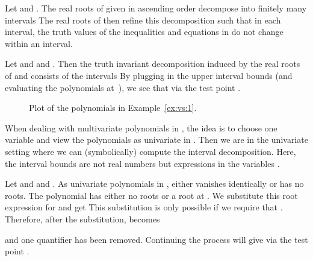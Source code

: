 \documentclass{llncs}
\begin{document}
Let  and . The
real roots  of  given in ascending order decompose
 into finitely many intervals
 The real roots of
 then refine this decomposition such that in each interval, the truth
values of the inequalities and equations in  do not change within an
interval. 

\begin{example}
\label{ex:vs:1}
Let  and  and . Then the truth invariant decomposition induced by
the real roots of  and  consists of the intervals
 By plugging in the
upper interval bounds (and evaluating the polynomials at~), we see that
 via the test point .
\begin{figure}
  \begin{center}

  \end{center}

  \caption{\label{fig:vs}Plot of the polynomials in Example~\ref{ex:vs:1}.}
\end{figure}
\end{example}
When dealing with multivariate polynomials in , the idea
is to choose one variable  and view the polynomials as univariate in
. Then we are in the univariate setting where we can (symbolically) compute
the interval decomposition. Here, the interval bounds are not real numbers but
expressions in the variables .

\begin{example}
  Let  and  and . As univariate polynomials in , 
  either vanishes identically or has no roots. The polynomial  has either
  no roots or a root at . We substitute this root expression for 
  and get
   This substitution is only possible if we
  require that . Therefore, after the substitution, 
  becomes
  
  and one quantifier has been removed. Continuing the process will give
   via the test point .
\end{example}
\end{document}
